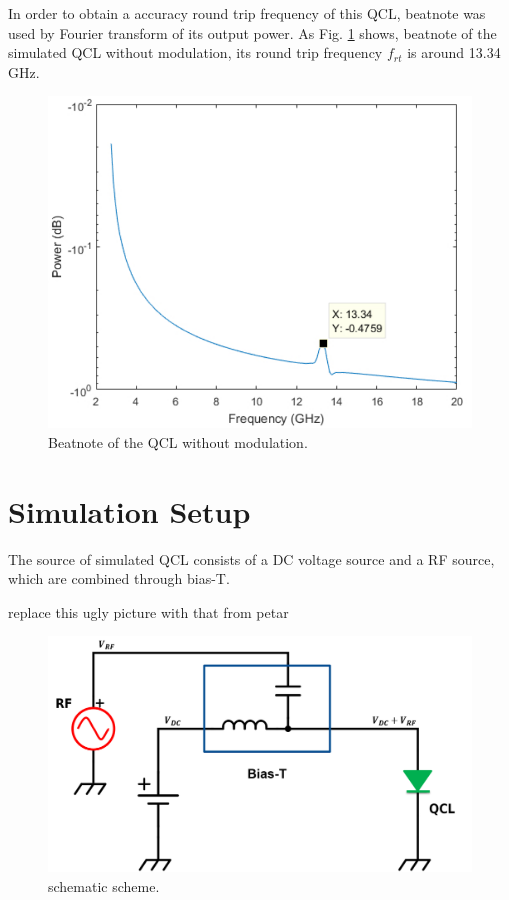 \documentclass[11pt,final]{scrbook}
\begin{document}
In order to obtain a accuracy round trip frequency of this QCL, beatnote was used by Fourier transform of its output power. As Fig. \ref{fig:beatnote_noRF} shows,  beatnote of the simulated QCL without modulation, its round trip frequency $f_{rt}$ is around 13.34 GHz.
\begin{figure}[htbp]
\begin{center}
\includegraphics[scale=0.8]{beatnote_noRF.pdf}
\caption{Beatnote of the QCL without modulation.}
\label{fig:beatnote_noRF}
\end{center}
\end{figure}


\section{Simulation Setup}
The source of simulated QCL consists of a DC voltage source and a RF source, which are combined through bias-T. 

replace this ugly picture with that from petar
\begin{figure}[htbp]
\begin{center}
\includegraphics[scale=0.4]{schematicSETUP}
\caption{schematic scheme.}
\label{fig:schematicSETUP}
\end{center}
\end{figure}
\end{document}
